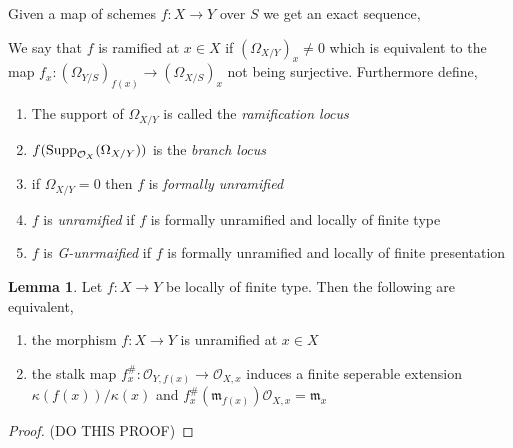 \documentclass[12pt]{extarticle}
\theoremstyle{definition}
\newtheorem{lemma}[theorem]{Lemma}
\newenvironment{definition}[1][Definition:]{\begin{trivlist}
\item[\hskip \labelsep {\bfseries #1}]}{\end{trivlist}}
\newcommand{\m}{\mathfrak{m}}
\begin{document}
\newcommand{\stalk}[2]{\mathcal{O}_{#1, #2}}
\newcommand{\Spec}[1]{\mathrm{Spec}\left(#1\right)}
\newcommand{\Proj}[1]{\mathrm{Proj}\left(#1\right)}
\newcommand{\mSpec}[1]{\mathrm{mSpec}\left(#1\right)}
\newcommand{\q}{\mathfrak{q}}
\newcommand{\p}{\mathfrak{p}}

\newcommand{\Ann}[2]{\mathrm{Ann}_{#1}\left( #2 \right)}
\newcommand{\Supp}[2]{\mathrm{Supp}_{#1}\left( #2 \right)}

\begin{definition}
Given a map of schemes $f : X \to Y$ over $S$ we get an exact sequence,
\begin{center}
\end{center}
We say that $f$ is ramified at $x \in X$ if $(\Omega_{X / Y})_x \neq 0$ which is equivalent to the map $f_x : (\Omega_{Y / S})_{f(x)} \to (\Omega_{X / S})_x$ not being surjective. Furthermore define,
\begin{enumerate}
\item The support of $\Omega_{X / Y}$ is called the \textit{ramification locus}
\item $f(\mathrm{Supp}_{\mathcal{O}_{X}}(\Omega_{X/Y}))$ is the \textit{branch locus}
\item if $\Omega_{X/Y} = 0$ then $f$ is \textit{formally unramified}
\item $f$ is \textit{unramified} if $f$ is formally unramified and locally of finite type
\item $f$ is \textit{G-unrmaified} if $f$ is formally unramified and locally of finite presentation 
\end{enumerate}
\end{definition}

\begin{lemma}
Let $f : X \to Y$ be locally of finite type. Then the following are equivalent,
\begin{enumerate}
\item the morphism $f : X \to Y$ is unramified at $x \in X$ 
\item the stalk map $f^\#_x : \stalk{Y}{f(x)} \to \stalk{X}{x}$
induces a finite seperable extension $\kappa(f(x)) / \kappa(x)$ and $f^\#_x(\m_{f(x)})\stalk{X}{x} = \m_x$
\end{enumerate} 
\end{lemma}

\begin{proof}
(DO THIS PROOF)
\end{proof}
\end{document}
